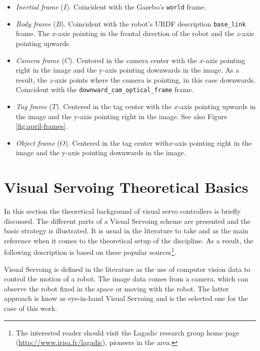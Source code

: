 \begin{itemize}
	\item \emph{Inertial frame} ($I$). Coincident with the Gazebo's \texttt{world} frame.
	
	\item \emph{Body frame} ($B$). Coincident with the robot's URDF description \texttt{base\_link} frame. The $x$-axis pointing in the frontal direction of the robot and the $z$-axis pointing upwards.
	
	\item \emph{Camera frame} ($C$). Centered in the camera center with the $x$-axis pointing right in the image and the y-axis pointing downwards in the image. As a result, the $z$-axis points where the camera is pointing, in this case downwards. Coincident with the \texttt{downward\_cam\_optical\_frame} frame.
	
	\item \emph{Tag frame} ($T$). Centered in the tag center with the $x$-axis pointing upwards in the image and the y-axis pointing right in the image. See also Figure \ref{fig:april-frames}.
	
	\item \emph{Object frame} ($O$). Centered in the tag center with$x$-axis pointing right in the image and the y-axis pointing downwards in the image.
\end{itemize}


\section{Visual Servoing Theoretical Basics}
\label{sec:vs-theory}

In this section the theoretical background of visual servo controllers is briefly discussed. The different parts of a Visual Servoing scheme are presented and the basic strategy is illustrated. It is usual in the literature to take \cite{chaumette_visual_2006} and \cite{chaumette_visual_2007} as the main reference when it comes to the theoretical setup of the discipline. As a result, the following description is based on these popular sources\footnote{The interested reader should visit the Lagadic research group home page (\url{http://www.irisa.fr/lagadic}), pioneers in the area.}.

Visual Servoing is defined in the literature as the use of computer vision data to control the motion of a robot. The image data comes from a camera, which can observe the robot fixed in the space or moving with the robot. The latter approach is know as eye-in-hand Visual Servoing and is the selected one for the case of this work.

